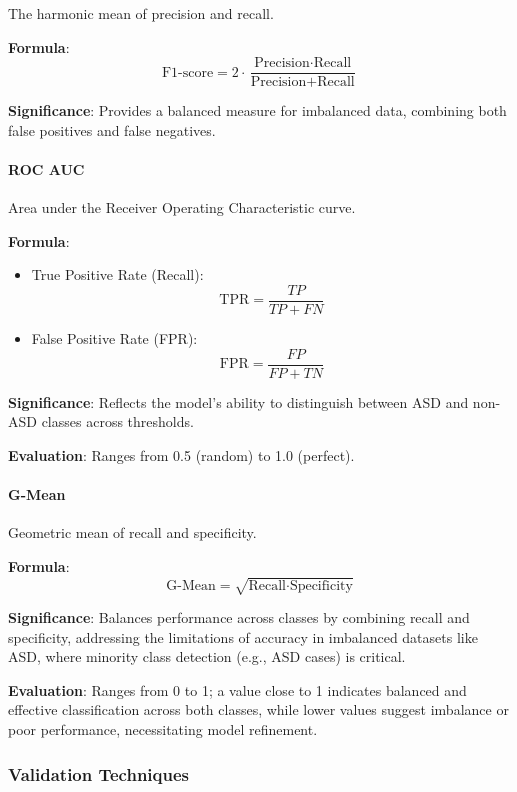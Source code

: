 \documentclass[conference]{IEEEtran}
\begin{document}
The harmonic mean of precision and recall.  

\textbf{Formula}:
\[
\text{F1-score} = 2 \cdot \frac{\text{Precision} \cdot \text{Recall}}{\text{Precision} + \text{Recall}}
\]

\textbf{Significance}: Provides a balanced measure for imbalanced data, combining both false positives and false negatives.

\paragraph{ROC AUC} 

Area under the Receiver Operating Characteristic curve. 

\textbf{Formula}:
\begin{itemize}
    \item True Positive Rate (Recall): 
    \[
    \text{TPR} = \frac{TP}{TP + FN}
    \]
    \item False Positive Rate (FPR): 
    \[
    \text{FPR} = \frac{FP}{FP + TN}
    \]
\end{itemize}

\textbf{Significance}: Reflects the model’s ability to distinguish between ASD and non-ASD classes across thresholds.  

\textbf{Evaluation}: Ranges from 0.5 (random) to 1.0 (perfect).

\paragraph{G-Mean} 

Geometric mean of recall and specificity.  

\textbf{Formula}:
\[
\text{G-Mean} = \sqrt{\text{Recall} \cdot \text{Specificity}}
\]

\textbf{Significance}: Balances performance across classes by combining recall and specificity, addressing the limitations of accuracy in imbalanced datasets like ASD, where minority class detection (e.g., ASD cases) is critical.  

\textbf{Evaluation}: Ranges from 0 to 1; a value close to 1 indicates balanced and effective classification across both classes, while lower values suggest imbalance or poor performance, necessitating model refinement.

\subsubsection{Validation Techniques}
\end{document}
